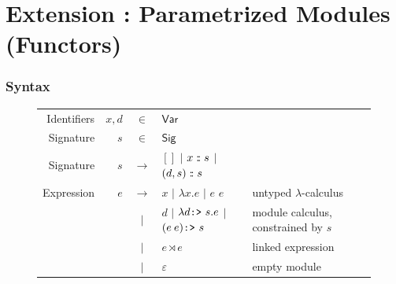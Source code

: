 \documentclass{beamer}
\theoremstyle{definition}
\newcommand*{\vbar}{|}
\newcommand*{\cons}{:{\hspace{-0.7em}}:}
\newcommand*{\ExprVar}{\mathsf{Var}}
\newcommand*{\modid}{d}
\newcommand*{\Sig}{\mathsf{Sig}}
\newcommand*{\link}[2]{{#1}\rtimes{#2}}
\newcommand*{\project}{\text{\texttt{:>} }}
\begin{document}
\section{Extension : Parametrized Modules (Functors)}
\begin{frame}[c]
  \frametitle{Syntax}
  \begin{figure}[h!]
    \footnotesize
    \centering
    \begin{tabular}{rrcll}
      Identifiers & $x,\modid$ & $\in$         & $\ExprVar$                                                                                                    \\
      Signature   & $s$        & $\in$         & $\Sig$                                                                                                        \\
      Signature   & $s$        & $\rightarrow$ & $[]$ $\vbar$ $x\cons s$ $\vbar$ $(\modid,s)\cons s$                                                           \\
      Expression  & $e$        & $\rightarrow$ & $x$ $\vbar$ $\lambda x.e$ $\vbar$ $e$ $e$                               & untyped $\lambda$-calculus          \\
                  &            & $\vbar$       & $\modid$ $\vbar$ $\lambda\modid\project s.e$ $\vbar$ $(e\:e)\project s$ & module calculus, constrained by $s$ \\
                  &            & $\vbar$       & $\link{e}{e}$                                                           & linked expression                   \\
                  &            & $\vbar$       & $\varepsilon$                                                           & empty module
    \end{tabular}
  \end{figure}
  \begin{center}
  \end{center}
\end{frame}
\end{document}
